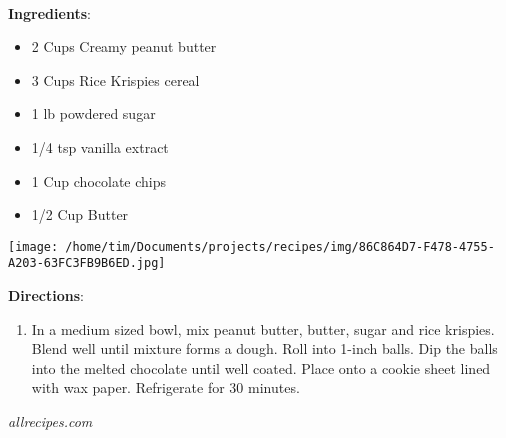\documentclass[11pt, twoside, openany]{book}
\begin{document}
 \label{chocolate-peanut-butter-crispy-balls}\hfill\textit{}\\
\begin{minipage}[t]{0.8\linewidth}
\textbf{Ingredients}:\vspace{-3mm}
\begin{multicols}{2}
\begin{itemize}\setlength\itemsep{-1mm}
\item 2 Cups Creamy peanut butter
\item 3 Cups Rice Krispies cereal
\item 1 lb powdered sugar
\item 1/4 tsp vanilla extract
\item 1 Cup chocolate chips
\item 1/2 Cup Butter
\end{itemize}
\end{multicols}
\end{minipage}
\begin{minipage}[t]{0.2\linewidth}
\centering \strut\vspace*{-\baselineskip}\newline
\texttt{[image: /home/tim/Documents/projects/recipes/img/86C864D7-F478-4755-A203-63FC3FB9B6ED.jpg]}\\
\end{minipage}\vspace{3mm}
\textbf{Directions}:
\vspace{-3mm}\begin{enumerate}\setlength\itemsep{-1mm}
\item In a medium sized bowl, mix peanut butter, butter, sugar and rice krispies. Blend well until mixture forms a dough. Roll into 1-inch balls. Dip the balls into the melted chocolate until well coated. Place onto a cookie sheet lined with wax paper. Refrigerate for 30 minutes.
\end{enumerate}
 \label{panang-curry-with-chicken}\hfill\textit{allrecipes.com}\\
\end{document}
